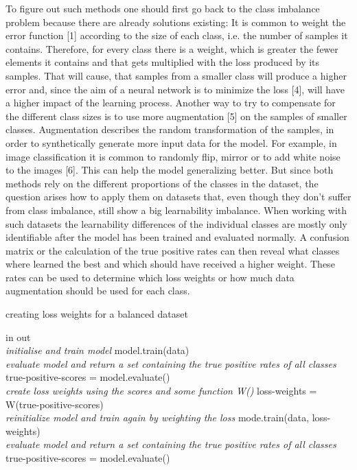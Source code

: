 \documentclass[journal]{IEEEtran}
\begin{document}
To figure out such methods one should first go back to the class imbalance problem because there are already solutions existing:
It is common to weight the error function [1] according to the size of each class, i.e. the number of samples it contains.
Therefore, for every class there is a weight, which is greater the fewer elements it contains and that gets multiplied with the loss produced by its samples. %
That will cause, that samples from a smaller class will produce a higher error and, since the aim of a neural network is to minimize the loss [4], will have a higher impact of the learning process.
Another way to try to compensate for the different class sizes is to use more augmentation [5] on the samples of smaller classes. 
Augmentation describes the random transformation of the samples, in order to synthetically generate more input data for the model. For example, in image classification it is common to randomly flip, mirror or to add white noise to the images [6].
This can help the model generalizing better.
But since both methods rely on the different proportions of the classes in the dataset, the question arises how to apply them on datasets that, even though they don't suffer from class imbalance, still show a big learnability imbalance.
When working with such datasets the learnability differences of the individual classes are mostly only identifiable after the model has been trained and evaluated normally. 
A confusion matrix or the calculation of the true positive rates can then reveal what classes where learned the best and which should have received a higher weight. 
These rates can be used to determine which loss weights or how much data augmentation should be used for each class.



\begin{algorithm}[H]
        \caption{creating loss weights for a balanced dataset}
        \begin{algorithmic}[1]

        \REQUIRE in
        \ENSURE  out 
        \\ \textit{initialise and train model}
         \STATE model.train(data)
        \\ \textit{evaluate model and return a set containing the true positive rates of all classes}
         \STATE true-positive-scores = model.evaluate()
        \\ \textit{create loss weights using the scores and some function W()}
         \STATE loss-weights = W(true-positive-scores)
        \\ \textit{reinitialize model and train again by weighting the loss}
         \STATE mode.train(data, loss-weights)
        \\ \textit{evaluate model and return a set containing the true positive rates of all classes}
         \STATE true-positive-scores = model.evaluate()
        \end{algorithmic}
        \end{algorithm}
\end{document}
